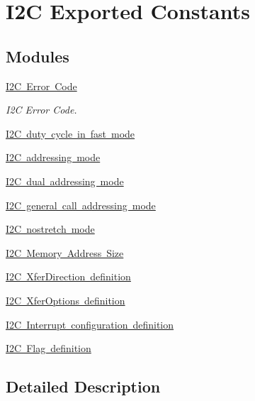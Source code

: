 \hypertarget{group___i2_c___exported___constants}{}\section{I2C Exported Constants}
\label{group___i2_c___exported___constants}
\subsection*{Modules}
\begin{DoxyCompactItemize}
\item 
\mbox{\hyperlink{group___i2_c___error___code}{I2\+C Error Code}}
\begin{DoxyCompactList}\small\item\em I2C Error Code. \end{DoxyCompactList}\item 
\mbox{\hyperlink{group___i2_c__duty__cycle__in__fast__mode}{I2\+C duty cycle in fast mode}}
\item 
\mbox{\hyperlink{group___i2_c__addressing__mode}{I2\+C addressing mode}}
\item 
\mbox{\hyperlink{group___i2_c__dual__addressing__mode}{I2\+C dual addressing mode}}
\item 
\mbox{\hyperlink{group___i2_c__general__call__addressing__mode}{I2\+C general call addressing mode}}
\item 
\mbox{\hyperlink{group___i2_c__nostretch__mode}{I2\+C nostretch mode}}
\item 
\mbox{\hyperlink{group___i2_c___memory___address___size}{I2\+C Memory Address Size}}
\item 
\mbox{\hyperlink{group___i2_c___xfer_direction__definition}{I2\+C Xfer\+Direction definition}}
\item 
\mbox{\hyperlink{group___i2_c___xfer_options__definition}{I2\+C Xfer\+Options definition}}
\item 
\mbox{\hyperlink{group___i2_c___interrupt__configuration__definition}{I2\+C Interrupt configuration definition}}
\item 
\mbox{\hyperlink{group___i2_c___flag__definition}{I2\+C Flag definition}}
\end{DoxyCompactItemize}


\subsection{Detailed Description}
